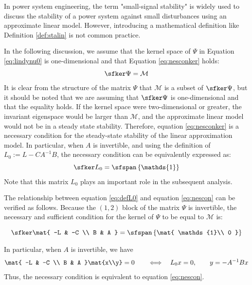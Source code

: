 \documentclass[graybox, envcountchap]{svmult}
\begin{document}
In power system engineering, the term "small-signal stability" is widely used to
discuss the stability of a power system against small disturbances using an
approximate linear model. However, introducing a mathematical definition like
Definition \ref{def:stalin} is not common practice.

In the following discussion, we assume that the kernel space of $\Psi$ in
Equation \ref{eq:lindynu0} is one-dimensional and that Equation
\ref{eq:nesconker} holds:
\begin{equation}\label{eq:nesconker}
  \sfker \Psi = \mathcal{M}
\end{equation}
It is clear from the structure of the matrix $\Psi$ that $\mathcal{M}$ is a
subset of $\sfker \Psi$, but it should be noted that we are assuming that
$\sfker \Psi$ is one-dimensional and that the equality holds. If the kernel
space were two-dimensional or greater, the invariant eigenspace would be larger
than $\mathcal{M}$, and the approximate linear model would not be in a steady
state stability.
Therefore, equation \ref{eq:nesconker} is a necessary condition for the
steady-state stability of the linear approximation model. In particular, when
$A$ is invertible, and using the definition of $L_0:= L-CA^{-1}B$, the
necessary condition can be equivalently expressed as:
\begin{equation}\label{eq:nescon}
  \sfker L_0 = \sfspan
  \left\{
  \mathds{1}
  \right\}
\end{equation}
Note that this matrix $L_0$ plays an important role in the subsequent analysis.

The relationship between equation \ref{eq:defL0} and equation \ref{eq:nescon}
can be verified as follows. Because the $(1,2)$ block of the matrix $\Psi$ is
invertible, the necessary and sufficient condition for the kernel of $\Psi$ to
be equal to $\mathcal{M}$ is:

\begin{equation*}%
  \sfker \mat{
  -L & -C \\
  B & A
  }
  = \sfspan
  \left\{
  \mat{
  \mathds{1}\\
  0
  }
  \right\}
\end{equation*}

In particular, when $A$ is invertible, we have
\begin{align*}
\mat{
-L & -C \\
B & A
}\mat{x\\y}
=0
\qquad
\Longleftrightarrow
\quad
L_0 x=0,
\qquad
y=-A^{-1}Bx
\end{align*}
Thus, the necessary condition is equivalent to equation \ref{eq:nescon}.
\end{document}
